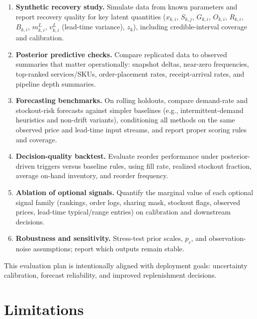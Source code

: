 \documentclass[11pt]{article}
\begin{document}
\begin{enumerate}
  \item \textbf{Synthetic recovery study.} Simulate data from known parameters and report recovery quality for key latent quantities ($x_{k,i}$, $S_{k,j}$, $G_{k,i}$, $O_{k,i}$, $R_{k,i}$, $B_{k,i}$, $m^L_{k,i}$, $v^L_{k,i}$ (lead-time variance), $z_k$), including credible-interval coverage and calibration.

  \item \textbf{Posterior predictive checks.} Compare replicated data to observed summaries that matter operationally: snapshot deltas, near-zero frequencies, top-ranked services/SKUs, order-placement rates, receipt-arrival rates, and pipeline depth summaries.

  \item \textbf{Forecasting benchmarks.} On rolling holdouts, compare demand-rate and stockout-risk forecasts against simpler baselines (e.g., intermittent-demand heuristics and non-drift variants), conditioning all methods on the same observed price and lead-time input streams, and report proper scoring rules and coverage.

  \item \textbf{Decision-quality backtest.} Evaluate reorder performance under posterior-driven triggers versus baseline rules, using fill rate, realized stockout fraction, average on-hand inventory, and reorder frequency.

  \item \textbf{Ablation of optional signals.} Quantify the marginal value of each optional signal family (rankings, order logs, sharing mask, stockout flags, observed prices, lead-time typical/range entries) on calibration and downstream decisions.

  \item \textbf{Robustness and sensitivity.} Stress-test prior scales, $p_c$, and observation-noise assumptions; report which outputs remain stable.
\end{enumerate}

This evaluation plan is intentionally aligned with deployment goals: uncertainty calibration, forecast reliability, and improved replenishment decisions.

\section{Limitations}
\end{document}
